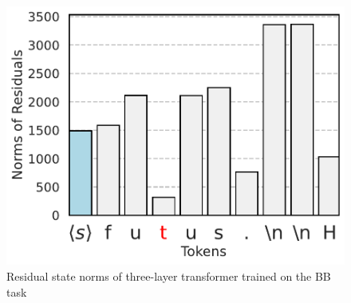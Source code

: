 \begin{figure}[h]
  \begin{minipage}{0.3\textwidth}
      \centering
      \vspace{-.2em}
      \includegraphics[width=\linewidth]{Figures/BBM_appendix/norms_layer_2.pdf}
  \end{minipage}
  \caption{\small Residual state norms of three-layer transformer trained on the BB task}
  \label{appfigure:massive-norm}
  \vspace{-1em}
\end{figure}


